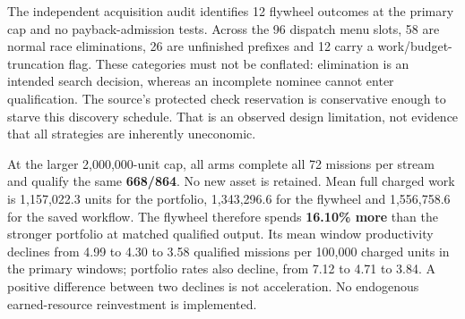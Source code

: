 The independent acquisition audit identifies 12 flywheel  outcomes at the primary cap and no payback-admission tests. Across the 96 dispatch menu slots, 58 are normal race eliminations, 26 are unfinished prefixes and 12 carry a work/budget-truncation flag. These categories must not be conflated: elimination is an intended search decision, whereas an incomplete nominee cannot enter qualification. The source's protected check reservation is conservative enough to starve this discovery schedule. That is an observed design limitation, not evidence that all strategies are inherently uneconomic.

At the larger 2,000,000-unit cap, all arms complete all 72 missions per stream and qualify the same \textbf{668/864}. No new asset is retained. Mean full charged work is 1,157,022.3 units for the portfolio, 1,343,296.6 for the flywheel and 1,556,758.6 for the saved workflow. The flywheel therefore spends \textbf{16.10\% more} than the stronger portfolio at matched qualified output. Its mean window productivity declines from 4.99 to 4.30 to 3.58 qualified missions per 100,000 charged units in the primary windows; portfolio rates also decline, from 7.12 to 4.71 to 3.84. A positive difference between two declines is not acceleration. No endogenous earned-resource reinvestment is implemented.
